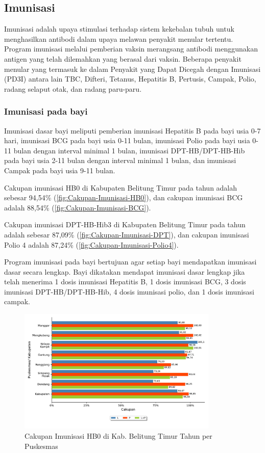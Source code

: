 \subsection{Imunisasi}
Imunisasi adalah upaya stimulasi terhadap sistem kekebalan tubuh untuk
menghasilkan antibodi dalam upaya melawan penyakit menular tertentu.
Program imunisasi melalui pemberian vaksin merangsang antibodi menggunakan
antigen yang telah dilemahkan yang berasal dari vaksin. Beberapa penyakit
menular yang termasuk ke dalam Penyakit yang Dapat Dicegah dengan
Imunisasi (PD3I) antara lain TBC, Difteri, Tetanus, Hepatitis B, Pertusis,
Campak, Polio, radang selaput otak, dan radang paru-paru.

\subsubsection{Imunisasi pada bayi}
Imunisasi dasar bayi meliputi pemberian imunisasi Hepatitis B pada
bayi usia 0-7 hari, imunisasi BCG pada bayi usia 0-11 bulan, imunisasi
Polio pada bayi usia 0-11 bulan dengan interval minimal 1 bulan, imunisasi
DPT-HB/DPT-HB-Hib pada bayi usia 2-11 bulan dengan interval minimal
1 bulan, dan imunisasi Campak pada bayi usia 9-11 bulan.

Cakupan imunisasi HB0 di Kabupaten Belitung Timur pada tahun \tP adalah sebesar 94,54\% (\autoref{fig:Cakupan-Imunisasi-HB0}), dan cakupan imunisasi BCG adalah 88,54\% (\autoref{fig:Cakupan-Imunisasi-BCG}).

Cakupan imunisasi DPT-HB-Hib3 di Kabupaten Belitung Timur pada tahun \tP
adalah sebesar 87,09\% (\autoref{fig:Cakupan-Imunisasi-DPT}), dan cakupan imunisasi Polio 4 adalah 87,24\% (\autoref{fig:Cakupan-Imunisasi-Polio4}).

Program imunisasi pada bayi bertujuan agar setiap bayi mendapatkan
imunisasi dasar secara lengkap. Bayi dikatakan mendapat imunisasi
dasar lengkap jika telah menerima 1 dosis imunisasi Hepatitis B, 1
dosis imunisasi BCG, 3 dosis imunisasi DPT-HB/DPT-HB-Hib, 4 dosis
imunisasi polio, dan 1 dosis imunisasi campak.

\begin{figure}[H]
    \centering
    \includegraphics[width=0.85\textwidth]{bab_05/bab_05_18a_imunHB0}
    \caption{Cakupan Imunisasi HB0 di Kab. Belitung Timur Tahun \tP per Puskesmas}
    \label{fig:Cakupan-Imunisasi-HB0}
\end{figure}

